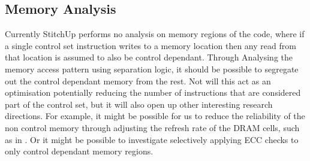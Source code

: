 \subsection{Memory Analysis}
Currently StitchUp performs no analysis on memory regions of the code,
where if a single control set instruction writes to a memory location
then any read from that location is assumed to also be control dependant.
Through Analysing the memory access pattern using separation logic, it should
be possible to segregate out the control dependant memory from the rest.
Not will this act as an optimisation potentially reducing the number of
instructions that are considered part of the control set, but it will also
open up other interesting research directions. For example, it might be possible
for us to reduce the reliability of the non control memory through adjusting
the refresh rate of the DRAM cells, such as in \cite{liu2012flikker}.
Or it might be possible to investigate selectively applying ECC checks to
only control dependant memory regions.
